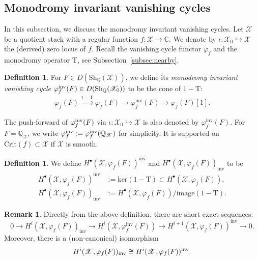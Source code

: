 \documentclass [11pt,oneside,a4paper,mathscr]{amsart}
\theoremstyle{definition}
\newtheorem{defn}[thm]{Definition}
\newtheorem{remark}[thm]{Remark}
\newcommand{\X}{\mathscr{X}}
\begin{document}
\subsection{Monodromy invariant vanishing cycles}\label{subsection:vanishing}
In this subsection, we discuss the monodromy invariant vanishing cycles. 
Let $\X$ be a quotient stack 
with a regular function $f \colon \X \to \mathbb{C}$. 
We denote by 
$\iota \colon \X_0 \hookrightarrow \X$
the (derived) zero locus of $f$. 
Recall the vanishing cycle functor $\varphi_f$ and 
the monodromy operator $\mathrm{T}$, see Subsection~\ref{subsec:nearby}. 
\begin{defn}\label{def:moninv}
For $F \in D(\mathrm{Sh}_{\mathbb{Q}}(\X))$, 
we define its
\textit{monodromy invariant vanishing cycle}
$\varphi_f^{\rm{inv}}(F) \in D(\mathrm{Sh}_{\mathbb{Q}}(\X_0))$ to be the cone of $1-\mathrm{T}$:
\begin{align}\label{thirdcolumn}
    \varphi_f(F)\xrightarrow{1-\mathrm{T}}\varphi_f(F)\to \varphi_f^{\mathrm{inv}}(F)\to \varphi_f(F)[1].
\end{align}
\end{defn}
The push-forward
of $\varphi_f^{\rm{inv}}(F)$ 
via $\iota \colon \X_0 \hookrightarrow \X$
is also denoted by $\varphi_f^{\mathrm{inv}}(F)$. 
For $F=\mathbb{Q}_{\X}$, we write 
$\varphi_f^{\rm{inv}}:=\varphi_f^{\rm{inv}}(\mathbb{Q}_{\X})$
for simplicity. 
It is supported on $\mathrm{Crit}(f) \subset \X$ 
if $\X$ is smooth. 

\begin{defn}
We define $H^\bullet(\X, \varphi_f(F))^{\mathrm{inv}}$
and $H^\bullet(\X, \varphi_f(F))_{\mathrm{inv}}$ to be 
\begin{align*}
    H^\bullet(\X, \varphi_f(F))^{\mathrm{inv}}&:=\text{ker}(1-\mathrm{T})\subset H^\bullet(\X, \varphi_f(F)),\\
    H^\bullet(\X, \varphi_f(F))_{\mathrm{inv}}&:=H^\bullet(\X, \varphi_f(F))/\text{image}(1-\mathrm{T}).
\end{align*}
\end{defn}
\begin{remark}
Directly from the above definition, there are 
  short exact sequences:
\begin{equation}\label{SESC}
0\to H^i(\X, \varphi_f(F))_{\mathrm{inv}}\to H^i(\X, \varphi_f^{\mathrm{inv}}(F))\to  H^{i+1}(\X, \varphi_f(F))^{\mathrm{inv}}\to 0.
\end{equation}
Moreover, there is a (non-canonical) isomorphism 
\begin{align}\label{minv:isom}
    H^i(\X, \varphi_f(F))_{\rm{inv}} \cong H^i(\X, \varphi_f(F))^{\rm{inv}}.
\end{align}
\end{remark}
\end{document}
